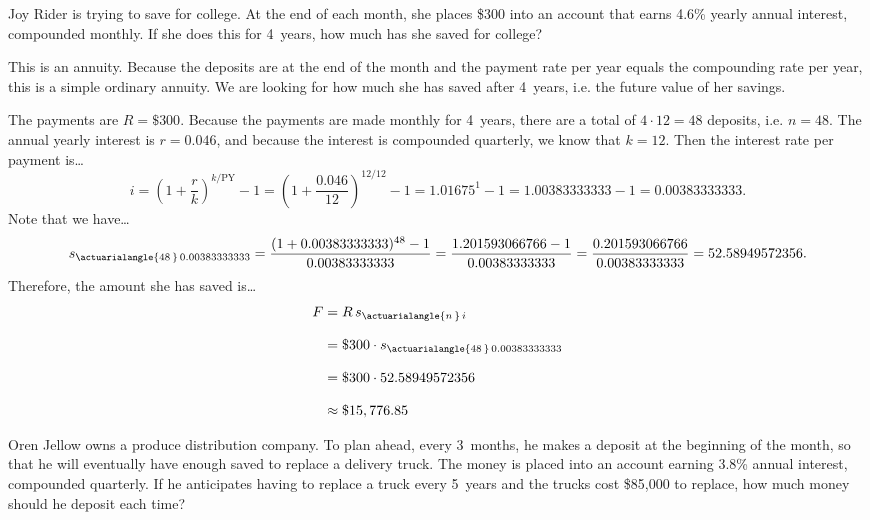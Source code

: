 \documentclass[11pt,letterpaper]{article}
\begin{document}

 Joy Rider is trying to save for college. At the end of each month, she places \$300 into an account that earns 4.6\% yearly annual interest, compounded monthly. If she does this for 4~years, how much has she saved for college? \pspace

\sol This is an annuity. Because the deposits are at the end of the month and the payment rate per year equals the compounding rate per year, this is a simple ordinary annuity. We are looking for how much she has saved after 4~years, i.e. the future value of her savings. \pspace

The payments are $R= \$300$. Because the payments are made monthly for 4~years, there are a total of $4 \cdot 12= 48$ deposits, i.e. $n= 48$. The annual yearly interest is $r= 0.046$, and because the interest is compounded quarterly, we know that $k= 12$. Then the interest rate per payment is\dots \pspace
	\[
	i= \left( 1 + \dfrac{r}{k} \right)^{k/\text{PY}} - 1= \left( 1 + \dfrac{0.046}{12} \right)^{12/12} - 1= 1.01675^1 - 1= 1.00383333333 - 1= 0.00383333333.
	\] \pspace
Note that we have\dots 
	\[
	s_{\actuarialangle{48\,}\, 0.00383333333}= \dfrac{(1 + 0.00383333333)^{48} - 1}{0.00383333333}= \dfrac{1.201593066766 - 1}{0.00383333333}= \dfrac{0.201593066766}{0.00383333333}= 52.58949572356.
	\] \pspace
Therefore, the amount she has saved is\dots \pspace
	\[
	\begin{aligned}
	F&= R\, s_{\actuarialangle{n\,}\, i} \\[0.3cm]
	&= \$300 \cdot s_{\actuarialangle{48\,}\, 0.00383333333} \\[0.3cm]
	&= \$300 \cdot 52.58949572356 \\[0.3cm]
	&\approx \$15,776.85
	\end{aligned}
	\] 



\newpage



 Oren Jellow owns a produce distribution company. To plan ahead, every 3~months, he makes a deposit at the beginning of the month, so that he will eventually have enough saved to replace a delivery truck. The money is placed into an account earning 3.8\% annual interest, compounded quarterly. If he anticipates having to replace a truck every 5~years and the trucks cost \$85,000 to replace, how much money should he deposit each time? \pspace
\end{document}
